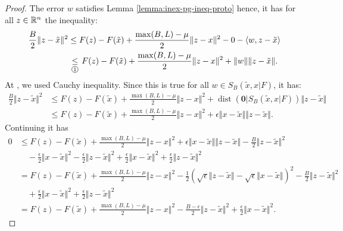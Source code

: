 \documentclass[12pt]{article}
\newcommand{\dist}{\ensuremath{\operatorname{dist}}}
\begin{document}
        \begin{proof}
            The error $w$ satisfies Lemma \ref{lemma:inex-pg-ineq-proto} hence, it has for all $z \in \mathbb R^n$ the inequality: 
            \begin{align*}
                \frac{B}{2}\Vert z - \tilde x\Vert^2
                &\le F(z) - F(\tilde x) + \frac{\max(B, L) - \mu}{2}\Vert z - x\Vert^2 - 0 - \langle w, z - \tilde x \rangle
                \\
                &\underset{\text{\circled{1}}}{\le}
                F(z) - F(\tilde x) + \frac{\max(B, L) - \mu}{2}\Vert z - x\Vert^2 
                + \Vert w\Vert \Vert z - \tilde x\Vert. 
            \end{align*}
            At , we used Cauchy inequality. 
            Since this is true for all $w \in S_B(\tilde x, x | F)$, it has: 
            \begin{align*}
                \frac{B}{2}\Vert z - \tilde x\Vert^2
                &\le F(z) - F(\tilde x) + \frac{\max(B, L) - \mu}{2}\Vert z - x\Vert^2 
                + \dist(\mathbf 0 | S_B(\tilde x, x | F))\Vert z - \tilde x\Vert
                \\
                &\le
                F(z) - F(\tilde x) + \frac{\max(B, L) - \mu}{2}\Vert z - x\Vert^2 + \epsilon \Vert x - \tilde x\Vert\Vert z - \tilde x\Vert. 
            \end{align*}
            Continuing it has 
            \begin{align*}
                0 &\le 
                F(z) - F(\tilde x) + \frac{\max(B, L) - \mu}{2}\Vert z - x\Vert^2
                + \epsilon \Vert x - \tilde x\Vert\Vert z - \tilde x\Vert 
                - \frac{B}{2}\Vert z - \tilde x\Vert^2
                    \\&\quad 
                    - \frac{\epsilon}{2}\Vert x - \tilde x\Vert^2 - \frac{\epsilon}{2}\Vert z - \tilde x \Vert^2
                    + \frac{\epsilon}{2}\Vert x - \tilde x\Vert^2 + \frac{\epsilon}{2}\Vert z - \tilde x \Vert^2
                \\
                &= F(z) - F(\tilde x) + \frac{\max(B, L) - \mu}{2}\Vert z - x\Vert^2
                - \frac{1}{2}\left(
                    \sqrt{\epsilon}\Vert z - \tilde x\Vert - \sqrt{\epsilon}\Vert x - \tilde x\Vert
                \right)^2
                - \frac{B}{2}\Vert z - \tilde x\Vert^2
                    \\
                    &\quad 
                    + \frac{\epsilon}{2}\Vert x - \tilde x\Vert^2 + \frac{\epsilon}{2}\Vert z - \tilde x \Vert^2
                \\
                &= F(z) - F(\tilde x) + \frac{\max(B, L) - \mu}{2}\Vert z - x\Vert^2
                - \frac{B - \epsilon}{2}\Vert z - \tilde x\Vert^2
                + \frac{\epsilon}{2}\Vert x - \tilde x \Vert^2. 
            \end{align*}
        \end{proof}
\end{document}
